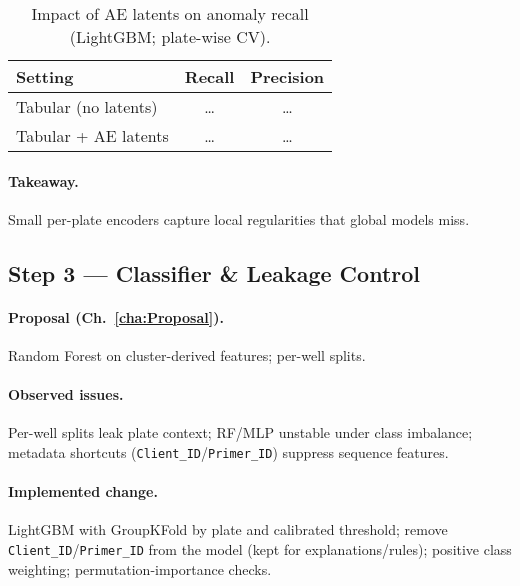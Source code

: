 
\begin{table}[H]
\centering
\caption{Impact of AE latents on anomaly recall (LightGBM; plate-wise CV).}
\label{tab:step2_latent_utility}
\begin{tabular}{|l|c|c|}
\hline
\textbf{Setting} & \textbf{Recall} & \textbf{Precision} \\\hline
Tabular (no latents) & \dots & \dots \\\hline
Tabular + AE latents  & \dots & \dots \\\hline
\end{tabular}
\end{table}

\paragraph{Takeaway.} Small per-plate encoders capture local regularities that global models miss.

\subsection*{Step 3 — Classifier \& Leakage Control}
\paragraph{Proposal (Ch.~\ref{cha:Proposal}).}
Random Forest on cluster-derived features; per-well splits.

\paragraph{Observed issues.}
Per-well splits leak plate context; RF/MLP unstable under class imbalance; metadata shortcuts (\texttt{Client\_ID}/\texttt{Primer\_ID}) suppress sequence features.

\paragraph{Implemented change.}
LightGBM with GroupKFold by plate and calibrated threshold; remove \texttt{Client\_ID}/\texttt{Primer\_ID} from the model (kept for explanations/rules); positive class weighting; permutation-importance checks.

